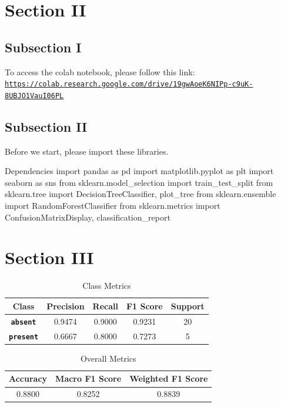 \documentclass[12pt, a4paper]{article}
\begin{document}
    \section{Section II}
        \subsection{Subsection I}
            To access the colab notebook, please follow this link: \texttt{\url{https://colab.research.google.com/drive/19gwAoeK6NIPp-c9uK-8UBJO1VauI06PL}}

        \subsection{Subsection II}
            Before we start, please import these libraries.

            \begin{codeblock}{Dependencies}
                import pandas as pd
                import matplotlib.pyplot as plt
                import seaborn as sns
                from sklearn.model_selection import train_test_split
                from sklearn.tree import DecisionTreeClassifier, plot_tree
                from sklearn.ensemble import RandomForestClassifier
                from sklearn.metrics import ConfusionMatrixDisplay, classification_report
            \end{codeblock}

    \pagebreak

    \section{Section III}
        \begin{table}[h]
            \centering
            \begin{tabular}{|c|c|c|c|c|}
                \hline
                \rule{0pt}{2.5ex}
                \textbf{Class} & \textbf{Precision} & \textbf{Recall} & \textbf{F1 Score} & \textbf{Support} \\
                \hline \hline
                \textbf{\texttt{absent}} & 0.9474 & 0.9000 & 0.9231 & 20 \\
                \textbf{\texttt{present}} & 0.6667 & 0.8000 & 0.7273 & 5 \\
                \hline
            \end{tabular}
            \caption{Class Metrics}
        \end{table}

        \begin{table}[h]
            \centering
            \begin{tabular}{|c|c|c|}
                \hline
                \rule{0pt}{2.5ex}
                \textbf{Accuracy} & \textbf{Macro F1 Score} & \textbf{Weighted F1 Score} \\
                \hline \hline
                0.8800 & 0.8252 & 0.8839 \\
                \hline
            \end{tabular}
            \caption{Overall Metrics}
        \end{table}
\end{document}
